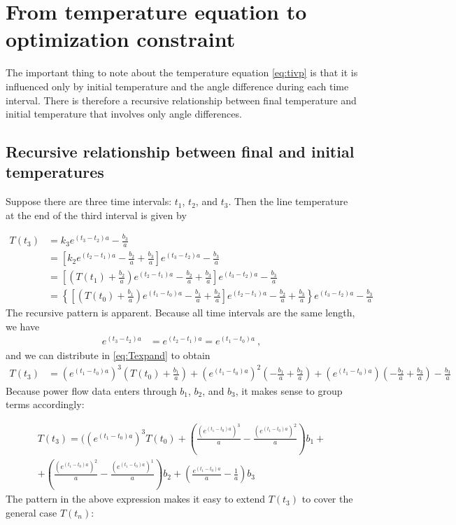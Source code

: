 \documentclass{article}
\begin{document}
\section{From temperature equation to optimization constraint}\label{from-ivp-to-optimization-constraint}

The important thing to note about the temperature equation \eqref{eq:tivp} is that it is influenced only by initial temperature and the angle difference during each time interval. There is therefore a recursive relationship between final temperature and initial temperature that involves only angle differences.

\subsection{Recursive relationship between final and initial temperatures}
Suppose there are three time intervals: $t_1$, $t_2$, and $t_3$. Then the line temperature at the end of the third interval is given by

\begin{align}
\nonumber T(t_3) &= k_3 e^{(t_3-t_2)a} - \frac{b_3}{a} \\
\nonumber &= \left[k_2 e^{(t_2-t_1)a} - \frac{b_2}{a} + \frac{b_3}{a}\right]e^{(t_3-t_2)a} - \frac{b_3}{a} \\
\nonumber &= \left[\left( T(t_1) + \frac{b_2}{a} \right)e^{(t_2-t_1)a} - \frac{b_2}{a} + \frac{b_3}{a}\right]e^{(t_3-t_2)a} - \frac{b_3}{a} \\
\label{eq:Texpand} &= \left\lbrace\left[\left(T(t_0) + \frac{b_1}{a}\right) e^{(t_1-t_0)a} - \frac{b_1}{a} + \frac{b_2}{a}\right]e^{(t_2-t_1)a} - \frac{b_2}{a} + \frac{b_3}{a}\right\rbrace e^{(t_3-t_2)a} - \frac{b_3}{a}
\end{align}
The recursive pattern is apparent. Because all time intervals are the same length, we have
\begin{align*}
e^{(t_3-t_2)a} &= e^{(t_2-t_1)a} = e^{(t_1-t_0)a}~,
\end{align*}
and we can distribute in \eqref{eq:Texpand} to obtain
\begin{align}
T(t_3) &= (e^{(t_1-t_0)a})^3\left(T(t_0) + \frac{b_1}{a}\right) + (e^{(t_1-t_0)a})^2\left(- \frac{b_1}{a} + \frac{b_2}{a}\right) + (e^{(t_1-t_0)a})\left(- \frac{b_2}{a} + \frac{b_3}{a}\right) - \frac{b_3}{a}
\end{align}
Because power flow data enters through $b_1$, $b_2$, and $b_3$, it makes sense to
group terms accordingly:

\begin{multline}
T(t_3) = ((e^{(t_1-t_0)a})^3T(t_0) + \left(\frac{(e^{(t_1-t_0)a})^3}{a} - \frac{(e^{(t_1-t_0)a})^2}{a}\right)b_1 + \\ + \left( \frac{(e^{(t_1-t_0)a})^2}{a} - \frac{(e^{(t_1-t_0)a})^1}{a}\right)b_2 + \left(\frac{e^{(t_1-t_0)a}}{a} - \frac{1}{a}\right) b_3
\end{multline}
The pattern in the above expression makes it easy to extend $T(t_3)$ to cover the general case $T(t_n)$:
\end{document}
